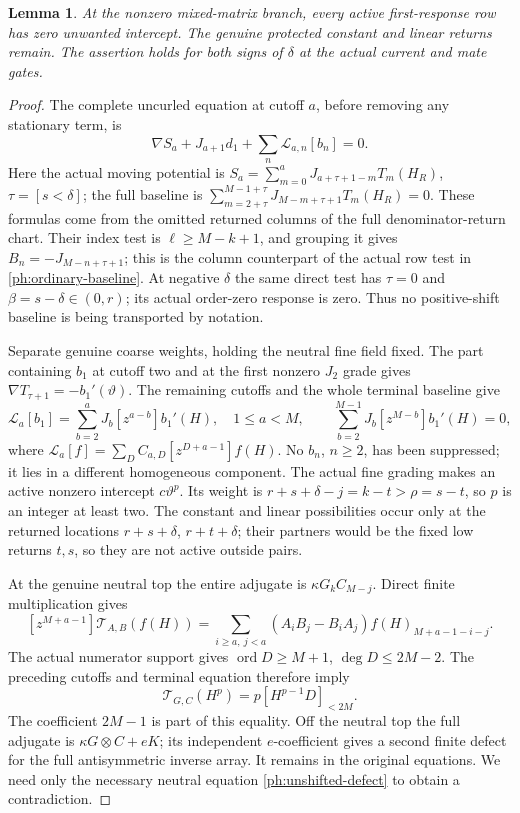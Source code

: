 \documentclass[11pt,a4paper]{amsart}
\numberwithin{equation}{section}
\theoremstyle{plain}
\newtheorem{lemma}[theorem]{Lemma}
\theoremstyle{definition}
\newcommand{\ord}{\operatorname{ord}}
\begin{document}
\begin{lemma}\label{ph:intercept-exclusion}
At the nonzero mixed-matrix branch, every active first-response row has
zero unwanted intercept.  The genuine protected constant and linear
returns remain.  The assertion holds for both signs of \(\delta\) at
the actual current and mate gates.
\end{lemma}
\begin{proof}
The complete uncurled equation at cutoff \(a\), before removing any
stationary term, is
\[
 \nabla S_a+J_{a+1}d_1+
       \sum_n\mathcal{L}_{a,n}[b_n]=0.
\]
Here the actual moving potential is
\(S_a=\sum_{m=0}^aJ_{a+\tau+1-m}T_m(H_R)\),
\(\tau=[s<\delta]\); the full baseline is
\(\sum_{m=2+\tau}^{M-1+\tau}J_{M-m+\tau+1}T_m(H_R)=0\).
These formulas come from the omitted returned columns of the full
denominator-return chart.  Their index test is
\(\ell\ge M-k+1\), and grouping it gives
\(B_n=-J_{M-n+\tau+1}\); this is the column counterpart of the actual
row test in \eqref{ph:ordinary-baseline}.
At negative \(\delta\) the same direct test has \(\tau=0\) and
\(\beta=s-\delta\in(0,r)\); its actual order-zero response is zero.
Thus no positive-shift baseline is being transported by notation.

Separate genuine coarse weights, holding the neutral fine field fixed.
The part containing \(b_1\) at cutoff two and at the first
nonzero \(J_2\) grade gives
\(\nabla T_{\tau+1}=-b_1'(\vartheta)\).
The remaining cutoffs and the whole terminal baseline give
\[
 \mathcal{L}_a[b_1]
   =\sum_{b=2}^{a}J_b[z^{a-b}]b_1'(H),\quad 1\le a<M,
 \qquad
 \sum_{b=2}^{M-1}J_b[z^{M-b}]b_1'(H)=0,
\]
where \(\mathcal{L}_a[f]=\sum_DC_{a,D}[z^{D+a-1}]f(H)\).
No \(b_n\), \(n\ge2\), has been suppressed; it lies in a different
homogeneous component.  The actual fine grading makes an active
nonzero intercept \(c\vartheta^p\).  Its weight is
\(r+s+\delta-j=k-t>\rho=s-t\), so \(p\) is an integer at least two.
The constant and linear possibilities occur only at the returned
locations \(r+s+\delta\), \(r+t+\delta\); their partners would be the
fixed low returns \(t,s\), so they are not active outside pairs.

At the genuine neutral top the entire adjugate is
\(\kappa G_kC_{M-j}\).  Direct finite multiplication gives
\[
 [z^{M+a-1}]\mathcal{T}_{A,B}(f(H))
 =\sum_{i\ge a,\ j<a}(A_iB_j-B_iA_j)
                              f(H)_{M+a-1-i-j}.
\]
The actual numerator support gives
\(\ord D\ge M+1\), \(\deg D\le2M-2\).
The preceding cutoffs and terminal equation therefore imply
\begin{equation}\label{ph:unshifted-defect}
 \mathcal{T}_{G,C}(H^p)=p[H^{p-1}D]_{<2M}.
\end{equation}
The coefficient \(2M-1\) is part of this equality.
Off the neutral top the full adjugate is
\(\kappa G\otimes C+eK\); its independent \(e\)-coefficient gives a
second finite defect for the full antisymmetric inverse array.
It remains in the original equations.  We need only the necessary
neutral equation \eqref{ph:unshifted-defect} to obtain a contradiction.


\end{proof}
\end{document}
